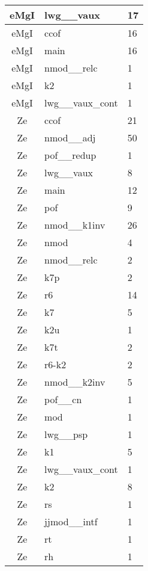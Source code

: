 \documentclass[a4 paper]{article}
\begin{document}
\begin{longtable}{cp{}p{}}
eMgI & lwg\_\_vaux & 17\\ \midrule eMgI & ccof & 16\\ \midrule eMgI & main & 16\\ \midrule eMgI & nmod\_\_relc & 1\\ \midrule eMgI & k2 & 1\\ \midrule eMgI & lwg\_\_vaux\_cont & 1\\ \midrule 
Ze & ccof & 21\\ \midrule Ze & nmod\_\_adj & 50\\ \midrule Ze & pof\_\_redup & 1\\ \midrule Ze & lwg\_\_vaux & 8\\ \midrule Ze & main & 12\\ \midrule Ze & pof & 9\\ \midrule Ze & nmod\_\_k1inv & 26\\ \midrule Ze & nmod & 4\\ \midrule Ze & nmod\_\_relc & 2\\ \midrule Ze & k7p & 2\\ \midrule Ze & r6 & 14\\ \midrule Ze & k7 & 5\\ \midrule Ze & k2u & 1\\ \midrule Ze & k7t & 2\\ \midrule Ze & r6-k2 & 2\\ \midrule Ze & nmod\_\_k2inv & 5\\ \midrule Ze & pof\_\_cn & 1\\ \midrule Ze & mod & 1\\ \midrule Ze & lwg\_\_psp & 1\\ \midrule Ze & k1 & 5\\ \midrule Ze & lwg\_\_vaux\_cont & 1\\ \midrule Ze & k2 & 8\\ \midrule Ze & rs & 1\\ \midrule Ze & jjmod\_\_intf & 1\\ \midrule Ze & rt & 1\\ \midrule Ze & rh & 1\\ \midrule 

\end{longtable}
\end{document}
